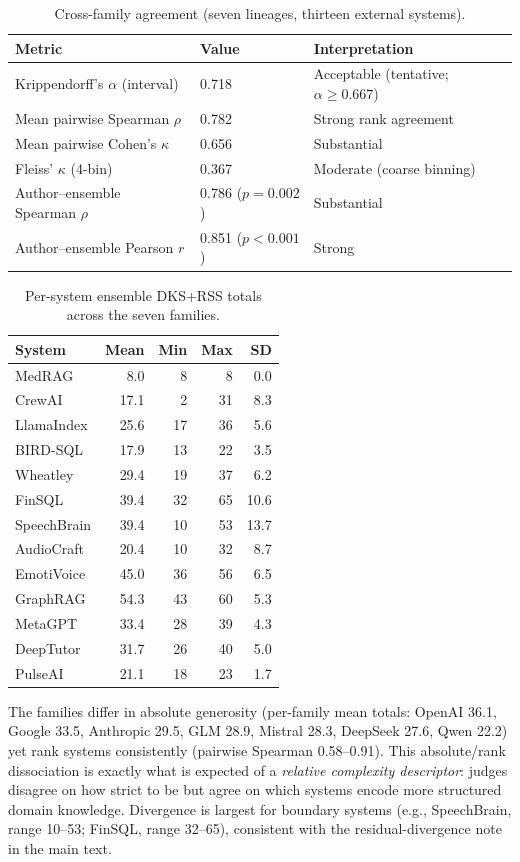 \documentclass[10pt,a4paper]{article}
\begin{document}
\begin{table}[h]
\centering
\caption{Cross-family agreement (seven lineages, thirteen external systems).}
\begin{tabular}{@{}lll@{}}
\toprule
Metric & Value & Interpretation \\
\midrule
Krippendorff's $\alpha$ (interval) & 0.718 & Acceptable (tentative; $\alpha\geq0.667$) \\
Mean pairwise Spearman $\rho$ & 0.782 & Strong rank agreement \\
Mean pairwise Cohen's $\kappa$ & 0.656 & Substantial \\
Fleiss' $\kappa$ (4-bin) & 0.367 & Moderate (coarse binning) \\
Author--ensemble Spearman $\rho$ & 0.786 ($p=0.002$) & Substantial \\
Author--ensemble Pearson $r$ & 0.851 ($p<0.001$) & Strong \\
\bottomrule
\end{tabular}
\end{table}

\begin{table}[h]
\centering
\caption{Per-system ensemble DKS+RSS totals across the seven families.}
\begin{tabular}{@{}lrrrr@{}}
\toprule
System & Mean & Min & Max & SD \\
\midrule
MedRAG & 8.0 & 8 & 8 & 0.0 \\
CrewAI & 17.1 & 2 & 31 & 8.3 \\
LlamaIndex & 25.6 & 17 & 36 & 5.6 \\
BIRD-SQL & 17.9 & 13 & 22 & 3.5 \\
Wheatley & 29.4 & 19 & 37 & 6.2 \\
FinSQL & 39.4 & 32 & 65 & 10.6 \\
SpeechBrain & 39.4 & 10 & 53 & 13.7 \\
AudioCraft & 20.4 & 10 & 32 & 8.7 \\
EmotiVoice & 45.0 & 36 & 56 & 6.5 \\
GraphRAG & 54.3 & 43 & 60 & 5.3 \\
MetaGPT & 33.4 & 28 & 39 & 4.3 \\
DeepTutor & 31.7 & 26 & 40 & 5.0 \\
PulseAI & 21.1 & 18 & 23 & 1.7 \\
\bottomrule
\end{tabular}
\end{table}

The families differ in absolute generosity (per-family mean totals: OpenAI 36.1, Google 33.5, Anthropic 29.5, GLM 28.9, Mistral 28.3, DeepSeek 27.6, Qwen 22.2) yet rank systems consistently (pairwise Spearman 0.58--0.91). This absolute/rank dissociation is exactly what is expected of a \emph{relative complexity descriptor}: judges disagree on how strict to be but agree on which systems encode more structured domain knowledge. Divergence is largest for boundary systems (e.g., SpeechBrain, range 10--53; FinSQL, range 32--65), consistent with the residual-divergence note in the main text.
\end{document}
